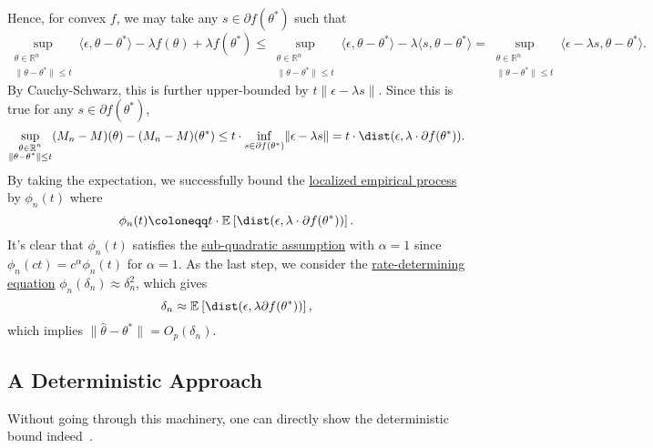 Hence, for convex \(f\), we may take any \(s\in \partial f(\theta ^{\ast} )\) such that
\[
	\sup _{\substack{\theta \in \mathbb{R} ^n                                            \\ \lVert \theta - \theta ^{\ast}  \rVert \leq t }} \langle \epsilon , \theta - \theta ^{\ast} \rangle - \lambda f(\theta ) + \lambda f(\theta ^{\ast} )
	\leq \sup _{\substack{\theta \in \mathbb{R} ^n                                    \\ \lVert \theta - \theta ^{\ast}  \rVert \leq t }} \langle \epsilon , \theta - \theta ^{\ast} \rangle - \lambda \langle s, \theta - \theta ^{\ast}  \rangle
	= \sup _{\substack{\theta \in \mathbb{R} ^n                                       \\ \lVert \theta - \theta ^{\ast}  \rVert \leq t }} \langle \epsilon - \lambda s, \theta - \theta ^{\ast}  \rangle .
\]
By Cauchy-Schwarz, this is further upper-bounded by \(t \lVert \epsilon - \lambda s \rVert\). Since this is true for any \(s\in \partial f(\theta ^{\ast} )\),
\[
	\sup _{\substack{\theta \in \mathbb{R} ^n \\ \lVert \theta - \theta ^{\ast}  \rVert \leq t }} (M_n - M)(\theta ) - (M_n - M)(\theta ^{\ast} )
	\leq t \cdot \inf _{s\in \partial f(\theta ^{\ast} )} \lVert \epsilon - \lambda s \rVert
	= t \cdot \dist(\epsilon , \lambda \cdot \partial f(\theta ^{\ast} )) .
\]
By taking the expectation, we successfully bound the \hyperref[def:localized-EP]{localized empirical process} by \(\phi _n (t)\) where
\[
	\phi _n(t) \coloneqq t \cdot \mathbb{E}_{}\left[\dist(\epsilon , \lambda \cdot \partial f(\theta ^{\ast} ))  \right] .
\]
It's clear that \(\phi _n(t)\) satisfies the \hyperref[def:sub-quadratic-assumption]{sub-quadratic assumption} with \(\alpha = 1\) since \(\phi _n(ct) = c^\alpha \phi _n(t)\) for \(\alpha = 1\). As the last step, we consider the \hyperref[def:rate-determining-equation]{rate-determining equation} \(\phi _n(\delta _n) \approx \delta _n^2\), which gives
\[
	\delta _n \approx \mathbb{E}_{}\left[\dist(\epsilon , \lambda \partial f(\theta ^{\ast} ))  \right] ,
\]
which implies \(\lVert \hat{\theta} - \theta ^{\ast}  \rVert = O_p(\delta _n)\).

\subsection{A Deterministic Approach}
Without going through this machinery, one can directly show the deterministic bound indeed~\cite{oymak2013sharp}.

